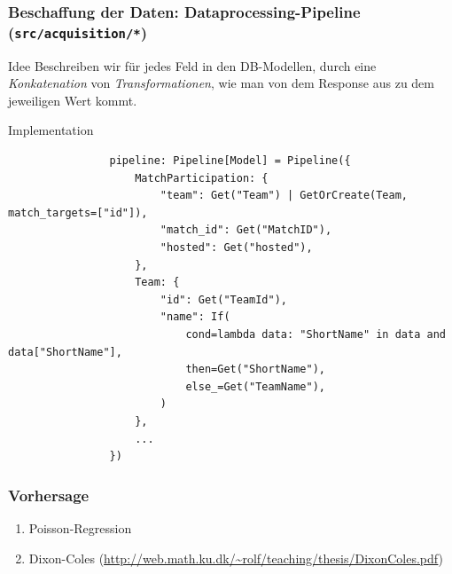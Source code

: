 \documentclass{beamer}
\begin{document}
    \begin{frame}[fragile]
        \frametitle{Beschaffung der Daten: Dataprocessing-Pipeline \tiny{(\texttt{src/acquisition/*})}}
        \begin{block}{Idee}
            Beschreiben wir für jedes Feld in den DB-Modellen, durch eine \textit{Konkatenation} von \textit{Transformationen}, wie man von dem Response aus zu dem jeweiligen Wert kommt.
        \end{block}
        \begin{exampleblock}{Implementation}
            \begin{verbatim}
                pipeline: Pipeline[Model] = Pipeline({
                    MatchParticipation: {
                        "team": Get("Team") | GetOrCreate(Team, match_targets=["id"]),
                        "match_id": Get("MatchID"),
                        "hosted": Get("hosted"),
                    },
                    Team: {
                        "id": Get("TeamId"),
                        "name": If(
                            cond=lambda data: "ShortName" in data and data["ShortName"],
                            then=Get("ShortName"),
                            else_=Get("TeamName"),
                        )
                    },
                    ...
                })
            \end{verbatim}
        \end{exampleblock}
    \end{frame}
    \begin{frame}
        \frametitle{Vorhersage}
        \begin{enumerate}
            \item Poisson-Regression
            \item Dixon-Coles \tiny{(\url{http://web.math.ku.dk/~rolf/teaching/thesis/DixonColes.pdf})}
        \end{enumerate}
    \end{frame}
\end{document}
